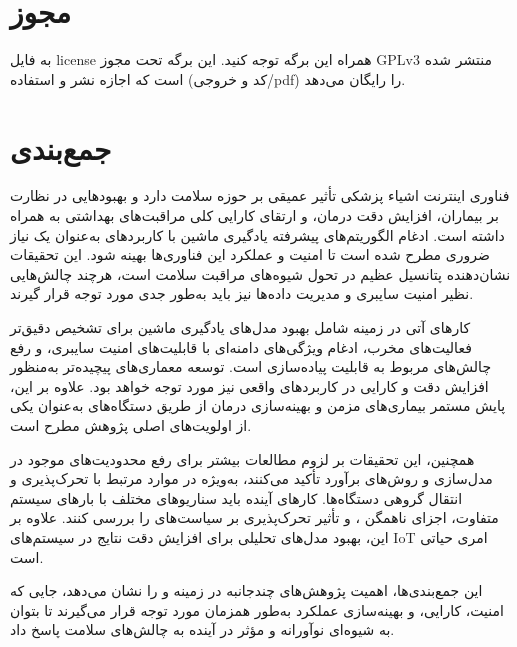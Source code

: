 \documentclass[a4paper]{article}
\begin{document}


\tableofcontents
\listoffigures
\listoftables

\section*{مجوز}

به فایل license همراه این برگه توجه کنید. این برگه تحت مجوز GPLv3 منتشر شده است
که اجازه نشر و استفاده (کد و خروجی/pdf) را رایگان می‌دهد.

\newpage

\newpage

\section{جمع‌بندی}

فناوری اینترنت اشیاء پزشکی  تأثیر عمیقی بر حوزه سلامت دارد و
بهبودهایی در نظارت بر بیماران، افزایش دقت درمان، و ارتقای کارایی کلی مراقبت‌های
بهداشتی به همراه داشته است. ادغام الگوریتم‌های پیشرفته یادگیری ماشین با
کاربردهای  به‌عنوان یک نیاز ضروری مطرح شده است تا امنیت و عملکرد این
فناوری‌ها بهینه شود.  این تحقیقات نشان‌دهنده پتانسیل عظیم  در تحول
شیوه‌های مراقبت سلامت است، هرچند چالش‌هایی نظیر امنیت سایبری و مدیریت داده‌ها
نیز باید به‌طور جدی مورد توجه قرار گیرند.

کارهای آتی در زمینه  شامل بهبود مدل‌های یادگیری ماشین برای تشخیص
دقیق‌تر فعالیت‌های مخرب، ادغام ویژگی‌های دامنه‌ای با قابلیت‌های امنیت سایبری، و
رفع چالش‌های مربوط به قابلیت پیاده‌سازی است. توسعه معماری‌های پیچیده‌تر به‌منظور
افزایش دقت و کارایی در کاربردهای واقعی نیز مورد توجه خواهد بود. علاوه بر این،
پایش مستمر بیماری‌های مزمن و بهینه‌سازی درمان از طریق دستگاه‌های 
به‌عنوان یکی از اولویت‌های اصلی پژوهش مطرح است.

همچنین، این تحقیقات بر لزوم مطالعات بیشتر برای رفع محدودیت‌های موجود در مدل‌سازی
 و روش‌های برآورد  تأکید می‌کنند، به‌ویژه در موارد مرتبط با
تحرک‌پذیری و انتقال گروهی دستگاه‌ها. کارهای آینده باید سناریوهای مختلف با بارهای
سیستم متفاوت، اجزای ناهمگن ، و تأثیر تحرک‌پذیری بر سیاست‌های
 را بررسی کنند. علاوه بر این، بهبود مدل‌های تحلیلی برای افزایش
دقت نتایج در سیستم‌های IoT امری حیاتی است.

این جمع‌بندی‌ها، اهمیت پژوهش‌های چندجانبه در زمینه  و  را نشان
می‌دهد، جایی که امنیت، کارایی، و بهینه‌سازی عملکرد به‌طور همزمان مورد توجه قرار
می‌گیرند تا بتوان به شیوه‌ای نوآورانه و مؤثر در آینده به چالش‌های سلامت پاسخ
داد.

\newpage


\end{document}
